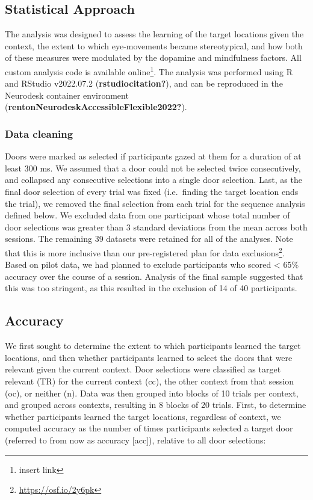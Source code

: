 \documentclass{article}
\begin{document}
\hypertarget{statistical-approach}{%
\subsection{Statistical Approach}\label{statistical-approach}}

The analysis was designed to assess the learning of the target locations
given the context, the extent to which eye-movements became
stereotypical, and how both of these measures were modulated by the
dopamine and mindfulness factors. All custom analysis code is available
online\footnote{insert link}. The analysis was performed using R and
RStudio v2022.07.2 (\textbf{rstudiocitation?}), and can be reproduced in
the Neurodesk container environment
(\textbf{rentonNeurodeskAccessibleFlexible2022?}).

\hypertarget{data-cleaning}{%
\subsubsection{Data cleaning}\label{data-cleaning}}

Doors were marked as selected if participants gazed at them for a
duration of at least 300 ms. We assumed that a door could not be
selected twice consecutively, and collapsed any consecutive selections
into a single door selection. Last, as the final door selection of every
trial was fixed (i.e.~finding the target location ends the trial), we
removed the final selection from each trial for the sequence analysis
defined below. We excluded data from one participant whose total number
of door selections was greater than 3 standard deviations from the mean
across both sessions. The remaining 39 datasets were retained for all of
the analyses. Note that this is more inclusive than our pre-registered
plan for data exclusions\footnote{\url{https://osf.io/2y6pk}}. Based on
pilot data, we had planned to exclude participants who scored
\textless{} 65\% accuracy over the course of a session. Analysis of the
final sample suggested that this was too stringent, as this resulted in
the exclusion of 14 of 40 participants.

\hypertarget{accuracy}{%
\subsection{Accuracy}\label{accuracy}}

We first sought to determine the extent to which participants learned
the target locations, and then whether participants learned to select
the doors that were relevant given the current context. Door selections
were classified as target relevant (TR) for the current context (cc),
the other context from that session (oc), or neither (n). Data was then
grouped into blocks of 10 trials per context, and grouped across
contexts, resulting in 8 blocks of 20 trials. First, to determine
whether participants learned the target locations, regardless of
context, we computed accuracy as the number of times participants
selected a target door (referred to from now as accuracy {[}acc{]}),
relative to all door selections:
\end{document}
